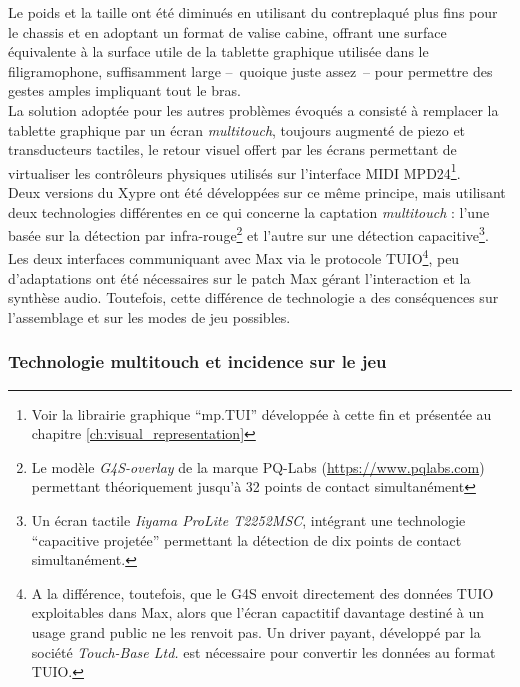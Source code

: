 \noindent Le poids et la taille ont été diminués en utilisant du contreplaqué plus fins pour le chassis et en adoptant un format de valise cabine, offrant une surface équivalente à la surface utile de la tablette graphique utilisée dans le filigramophone, suffisamment large --~quoique juste assez~-- pour permettre des gestes amples impliquant tout le bras.\\
\indent La solution adoptée pour les autres problèmes évoqués a consisté à remplacer la tablette graphique par un écran \textit{multitouch}, toujours augmenté de piezo et transducteurs tactiles, le retour visuel offert par les écrans permettant de virtualiser les contrôleurs physiques utilisés sur l'interface \gls{MIDI} MPD24\footnote{Voir la librairie graphique ``mp.TUI'' développée à cette fin et présentée au chapitre \ref{ch:visual_representation}}.\\
\indent Deux versions du Xypre ont été développées sur ce même principe, mais utilisant deux technologies différentes en ce qui concerne la captation \textit{multitouch} : l'une basée sur la détection par infra-rouge\footnote{Le modèle \textit{G4S-overlay} de la marque PQ-Labs (\url{https://www.pqlabs.com}) permettant théoriquement jusqu'à 32 points de contact simultanément} et l'autre sur une détection capacitive\footnote{Un écran tactile \textit{Iiyama ProLite T2252MSC}, intégrant une technologie ``capacitive projetée'' permettant la détection de dix points de contact simultanément.}. Les deux interfaces communiquant avec Max via le protocole \gls{TUIO}\footnote{A la différence, toutefois, que le G4S envoit directement des données \gls{TUIO} exploitables dans Max, alors que l'écran capactitif davantage destiné à un usage grand public ne les renvoit pas. Un driver payant, développé par la société \textit{Touch-Base Ltd.} est nécessaire pour convertir les données au format \gls{TUIO}.}, peu d'adaptations ont été nécessaires sur le patch Max gérant l'interaction et la synthèse audio. Toutefois, cette différence de technologie a des conséquences sur l'assemblage et sur les modes de jeu possibles. 

\subsubsection{Technologie multitouch et incidence sur le jeu}

